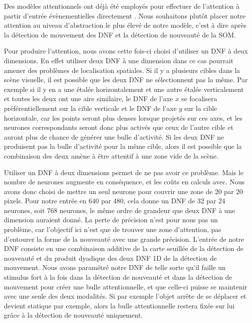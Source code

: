 	Des modèles attentionnels ont déjà été employés pour effectuer de l'attention à partir d'entrée évènementielles directement \cite{evanusa2019event}. Nous souhaitons plutôt placer notre attention au niveau d'abstraction le plus élevé de notre modèle, c'est à dire après la détection de mouvement des DNF et la détection de nouveauté de la SOM.

	Pour produire l'attention, nous avons cette fois-ci choisi d'utiliser un DNF à deux dimensions. En effet utiliser deux DNF à une dimension dans ce cas pourrait amener des problèmes de localisation spatiales. Si il y a plusieurs cibles dans la scène visuelle, il est possible que les deux DNF ne sélectionnent pas la même. Par exemple si il y en a une étalée horizontalement et une autre étalée verticalement et toutes les deux ont une aire similaire, le DNF de l'axe $x$ se focalisera préférentiellement sur la cible verticale et le DNF de l'axe $y$ sur la cible horizontale, car les points seront plus denses lorsque projetés sur ces axes, et les neurones correspondants seront donc plus activés que ceux de l'autre cible et auront plus de chance de générer une bulle d'activité. Si les deux DNF ne produisent pas la bulle d'activité pour la même cible, alors il est possible que la combinaison des deux amène à être attentif à une zone vide de la scène.

	Utiliser un DNF à deux dimensions permet de ne pas avoir ce problème. Mais le nombre de neurones augmente en conséquence, et les coûts en calculs avec. Nous avons donc choisi de mettre un seul neurone pour couvrir une zone de 20 par 20 pixels. Pour notre entrée en 640 par 480, cela donne un DNF de 32 par 24 neurones, soit 768 neurones, le même ordre de grandeur que deux DNF à une dimension auraient donné. La perte de précision n'est pour nous pas un problème, car l'objectif ici n'est que de trouver une zone d'attention, pas d'entourer la forme de la nouveauté avec une grande précision. L'entrée de notre DNF consiste en une combinaison additive de la carte seuillée de la détection de nouveauté et du produit dyadique des deux DNF 1D de la détection de mouvement. Nous avons paramétré notre DNF de telle sorte qu'il faille un stimulus fort à la fois dans la détection de nouveauté et dans la détection de mouvement pour créer une bulle attentionnelle, et que celle-ci puisse se maintenir avec une seule des deux modalités. Si par exemple l'objet arrête de se déplacer et devient statique par exemple, alors la bulle attentionnelle restera fixée sur lui grâce à la détection de nouveauté uniquement.

